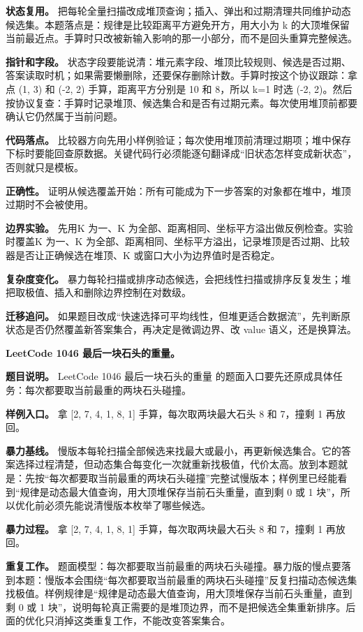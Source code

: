 \textbf{状态复用。} 把每轮全量扫描改成堆顶查询；插入、弹出和过期清理共同维护动态候选集。本题落点是：规律是比较距离平方避免开方，用大小为 k 的大顶堆保留当前最近点。手算时只改被新输入影响的那一小部分，而不是回头重算完整候选。

\textbf{指针和字段。} 状态字段要能说清：堆元素字段、堆顶比较规则、候选是否过期、答案读取时机；如果需要懒删除，还要保存删除计数。手算时按这个协议跟踪：拿点 (1, 3) 和 (-2, 2) 手算，距离平方分别是 10 和 8，所以 k=1 时选 (-2, 2)。然后按协议复查：手算时记录堆顶、候选集合和是否有过期元素。每次使用堆顶前都要确认它仍然属于当前问题。

\textbf{代码落点。} 比较器方向先用小样例验证；每次使用堆顶前清理过期项；堆中保存下标时要能回查原数据。关键代码行必须能逐句翻译成“旧状态怎样变成新状态”，否则就只是模板。

\textbf{正确性。} 证明从候选覆盖开始：所有可能成为下一步答案的对象都在堆中，堆顶过期时不会被使用。

\textbf{边界实验。} 先用K 为一、K 为全部、距离相同、坐标平方溢出做反例检查。实验时覆盖K 为一、K 为全部、距离相同、坐标平方溢出，记录堆顶是否过期、比较器是否让正确候选在堆顶、K 或窗口大小为边界值时是否稳定。

\textbf{复杂度变化。} 暴力每轮扫描或排序动态候选，会把线性扫描或排序反复发生；堆把取极值、插入和删除边界控制在对数级。

\textbf{迁移追问。} 如果题目改成“快速选择可平均线性，但堆更适合数据流”，先判断原状态是否仍然覆盖新答案集合，再决定是微调边界、改 value 语义，还是换算法。

\noindent\textbf{LeetCode 1046 最后一块石头的重量。}

\textbf{题目说明。} LeetCode 1046 最后一块石头的重量 的题面入口要先还原成具体任务：每次都要取当前最重的两块石头碰撞。

\textbf{样例入口。} 拿 [2, 7, 4, 1, 8, 1] 手算，每次取两块最大石头 8 和 7，撞剩 1 再放回。

\textbf{暴力基线。} 慢版本每轮扫描全部候选来找最大或最小，再更新候选集合。它的答案选择过程清楚，但动态集合每变化一次就重新找极值，代价太高。放到本题就是：先按“每次都要取当前最重的两块石头碰撞”完整试慢版本；样例里已经能看到“规律是动态最大值查询，用大顶堆保存当前石头重量，直到剩 0 或 1 块”，所以优化前必须先能说清慢版本枚举了哪些候选。

\textbf{暴力过程。} 拿 [2, 7, 4, 1, 8, 1] 手算，每次取两块最大石头 8 和 7，撞剩 1 再放回。

\textbf{重复工作。} 题面模型：每次都要取当前最重的两块石头碰撞。暴力版的慢点要落到本题：慢版本会围绕“每次都要取当前最重的两块石头碰撞”反复扫描动态候选集找极值。样例规律是“规律是动态最大值查询，用大顶堆保存当前石头重量，直到剩 0 或 1 块”，说明每轮真正需要的是堆顶边界，而不是把候选全集重新排序。后面的优化只消掉这类重复工作，不能改变答案集合。

